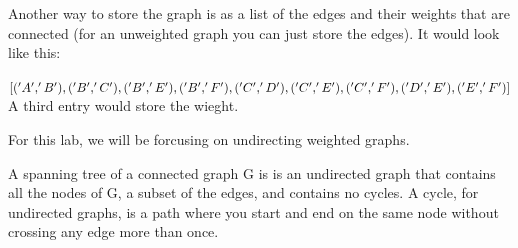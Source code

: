 Another way to store the graph is as a list of the edges and their weights that are connected (for an unweighted graph you can just store the edges). It would look like this:

$[('A', 'B'),
 ('B', 'C'),
 ('B', 'E'),
 ('B', 'F'),
 ('C', 'D'),\\
 ('C', 'E'),
 ('C', 'F'),
 ('D', 'E'),
 ('E', 'F')]$\\
A third entry would store the wieght.

For this lab, we will be forcusing on undirecting weighted graphs. 

A spanning tree of a connected graph G is is an undirected graph that contains all the nodes of G, a subset of the edges, and contains no cycles. A cycle, for undirected graphs, is a path where you start and end on the same node without crossing any edge more than once.

